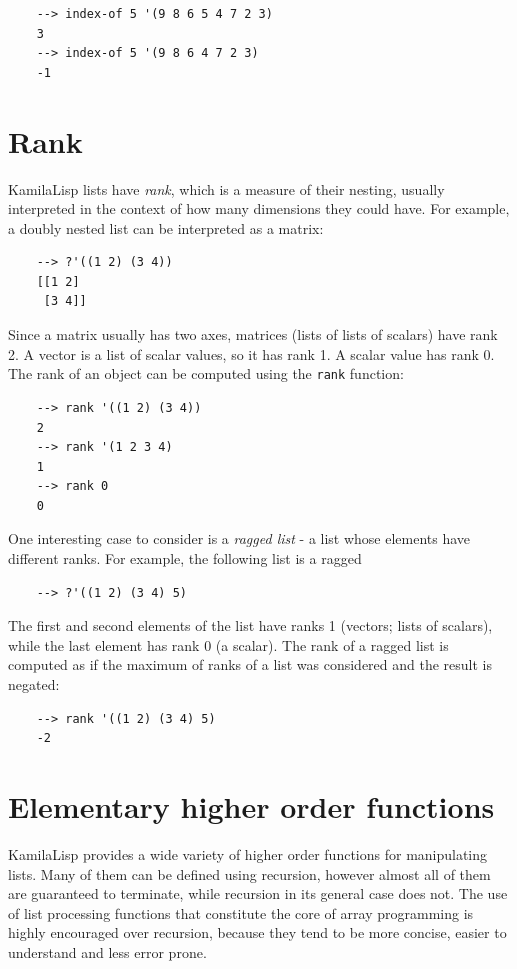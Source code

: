 \begin{Verbatim}
    --> index-of 5 '(9 8 6 5 4 7 2 3)
    3
    --> index-of 5 '(9 8 6 4 7 2 3)
    -1
\end{Verbatim}

\section{Rank}

KamilaLisp lists have \textit{rank}, which is a measure of their nesting, usually interpreted in the context of how many dimensions they could have. For example, a doubly nested list can be interpreted as a matrix:

\begin{Verbatim}
    --> ?'((1 2) (3 4))
    [[1 2]
     [3 4]]
\end{Verbatim}

Since a matrix usually has two axes, matrices (lists of lists of scalars) have rank 2. A vector is a list of scalar values, so it has rank 1. A scalar value has rank 0. The rank of an object can be computed using the \verb|rank| function:

\begin{Verbatim}
    --> rank '((1 2) (3 4))
    2
    --> rank '(1 2 3 4)
    1
    --> rank 0
    0
\end{Verbatim}

One interesting case to consider is a \textit{ragged list} - a list whose elements have different ranks. For example, the following list is a ragged 

\begin{Verbatim}
    --> ?'((1 2) (3 4) 5)
\end{Verbatim}

The first and second elements of the list have ranks 1 (vectors; lists of scalars), while the last element has rank 0 (a scalar). The rank of a ragged list is computed as if the maximum of ranks of a list was considered and the result is negated:

\begin{Verbatim}
    --> rank '((1 2) (3 4) 5)
    -2
\end{Verbatim}

\section{Elementary higher order functions}

KamilaLisp provides a wide variety of higher order functions for manipulating lists. Many of them can be defined using recursion, however almost all of them are guaranteed to terminate, while recursion in its general case does not. The use of list processing functions that constitute the core of array programming is highly encouraged over recursion, because they tend to be more concise, easier to understand and less error prone.

